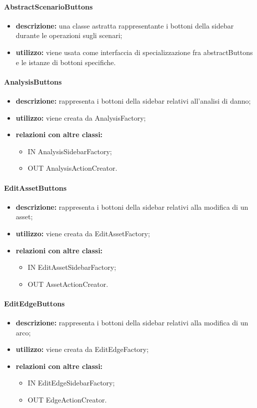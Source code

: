 \paragraph{AbstractScenarioButtons}
\begin{itemize}
	\item \textbf{descrizione:} una classe astratta rappresentante i bottoni della sidebar durante le operazioni sugli scenari;
	\item \textbf{utilizzo:} viene usata come interfaccia di specializzazione fra abstractButtons e le istanze di bottoni specifiche.
\end{itemize}
\paragraph{AnalysisButtons}
\begin{itemize}
	\item \textbf{descrizione:} rappresenta i bottoni della sidebar relativi all'analisi di danno;
	\item \textbf{utilizzo:} viene creata da AnalysisFactory;
	\item \textbf{relazioni con altre classi:} 
	\begin{itemize}
		\item IN AnalysisSidebarFactory;
		\item OUT AnalysisActionCreator.
	\end{itemize}
\end{itemize}
\paragraph{EditAssetButtons}
\begin{itemize}
	\item \textbf{descrizione:} rappresenta i bottoni della sidebar relativi alla modifica di un asset;
	\item \textbf{utilizzo:} viene creata da EditAssetFactory;
	\item \textbf{relazioni con altre classi:} 
	\begin{itemize}
		\item IN EditAssetSidebarFactory;
		\item OUT AssetActionCreator.
	\end{itemize}
\end{itemize}
\paragraph{EditEdgeButtons}
\begin{itemize}
	\item \textbf{descrizione:} rappresenta i bottoni della sidebar relativi alla modifica di un arco;
	\item \textbf{utilizzo:} viene creata da EditEdgeFactory;
	\item \textbf{relazioni con altre classi:} 
	\begin{itemize}
		\item IN EditEdgeSidebarFactory;
		\item OUT EdgeActionCreator.
	\end{itemize}
\end{itemize}
